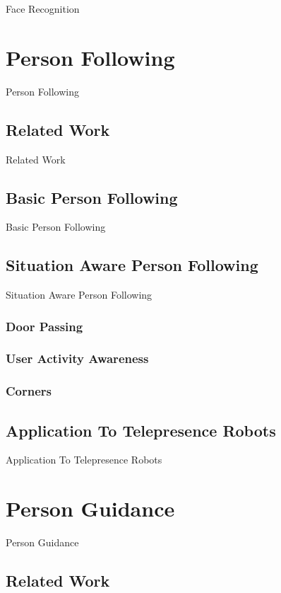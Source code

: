 \documentclass[12pt]{gatech-thesis}
\begin{document}
Face Recognition

\chapter{Person Following}

Person Following

\section{Related Work}

Related Work

\section{Basic Person Following}

Basic Person Following

\section{Situation Aware Person Following}

Situation Aware Person Following

\subsection{Door Passing}

\subsection{User Activity Awareness}

\subsection{Corners}


\section{Application To Telepresence Robots}

Application To Telepresence Robots

\chapter{Person Guidance}

Person Guidance

\section{Related Work}
\end{document}
